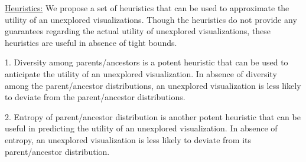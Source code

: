 
\underline{Heuristics:} We propose a set of heuristics that can be used to approximate the utility of an unexplored visualizations. Though the heuristics do not provide any guarantees regarding the actual utility of unexplored visualizations, these heuristics are useful in absence of tight bounds. 

1. Diversity among parents/ancestors is a potent heuristic that can be used to anticipate the utility of an unexplored visualization. In absence of diversity among the parent/ancestor distributions, an unexplored visualization is less likely to deviate from the parent/ancestor distributions.

2. Entropy of parent/ancestor distribution is another potent heuristic that can be useful in predicting the utility of an unexplored visualization. In absence of entropy, an unexplored visualization is less likely to deviate from its parent/ancestor distribution.




